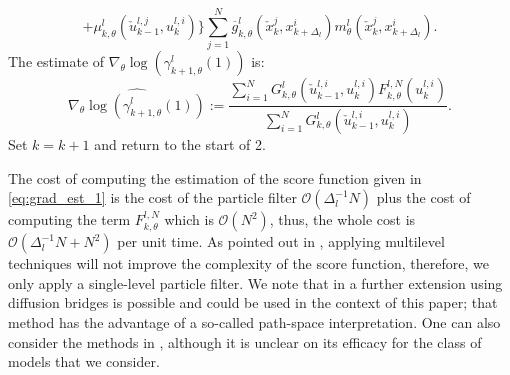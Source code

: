\documentclass[english]{article}
\begin{document}
\begin{algorithm}[h!]
\begin{enumerate}
{\begin{equation}
{+ \mu_{k,\theta}^l(\check{u}_{k-1}^{l,j},u_{k}^{l,i})
\}}
{\sum_{j=1}^N \overline{g}_{k,\theta}^l(\check{x}_k^j,x_{k+\Delta_l}^i)m_{\theta}^l(\check{x}_k^j,x_{k+\Delta_l}^i)
}.
\end{equation}
%
The estimate of
$\nabla_{\theta}\log(\gamma_{k+1,\theta}^l(1))$
 is:
%
\begin{equation}
\label{eq:grad_est_1}
\widehat{\nabla_{\theta}\log(\gamma_{k+1,\theta}^l(1))} := 
\frac{\sum_{i=1}^N G_{k,\theta}^l(\check{u}_{k-1}^{l,i},u_{k}^{l,i})F_{k,\theta}^{l,N}(u_{k}^{l,i})}{\sum_{i=1}^N G_{k,\theta}^l(\check{u}_{k-1}^{l,i},u_{k}^{l,i})}.
\end{equation}
%
Set $k=k+1$ and return to the start of 2.}
\end{enumerate}
\end{algorithm}

The cost of computing the estimation of the score function given in \eqref{eq:grad_est_1} is the cost of the particle filter $\mathcal{O}(\Delta^{-1}_l N)$ plus the cost of computing the term $F_{k,\theta}^{l,N}$ which is $\mathcal{O}(N^2)$, thus, the whole cost is $\mathcal{O}(\Delta^{-1}_l N+N^2)$ per unit time. As pointed out in \cite{beskos}, applying multilevel techniques will not improve the complexity of the score function, therefore, we only apply a single-level particle filter. We note that in \cite{beskos} a further extension using diffusion bridges is possible and could be used in the context of this paper; that method has the advantage of a so-called path-space interpretation. One can also consider the methods in \cite{chopin_Hai-Dang}, although it is unclear on its efficacy for the class of models that we consider.





\end{document}
